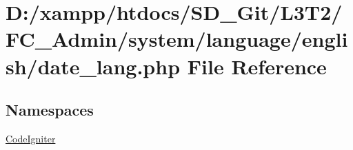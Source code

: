 \hypertarget{date__lang_8php}{}\section{D\+:/xampp/htdocs/\+S\+D\+\_\+\+Git/\+L3\+T2/\+F\+C\+\_\+\+Admin/system/language/english/date\+\_\+lang.php File Reference}
\label{date__lang_8php}
\subsection*{Namespaces}
\begin{DoxyCompactItemize}
\item 
 \hyperlink{namespace_code_igniter}{Code\+Igniter}
\end{DoxyCompactItemize}
